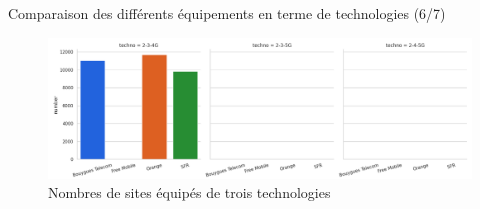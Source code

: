 \begin{frame}{Comparaison des différents équipements en terme de technologies (6/7)}
    \begin{figure}
        \includegraphics[height=0.4\paperheight]{images/barplots/2-x-yG.png}
        \caption{\label{fig:2-x-yG}Nombres de sites équipés de trois technologies}
    \end{figure}
\end{frame}

